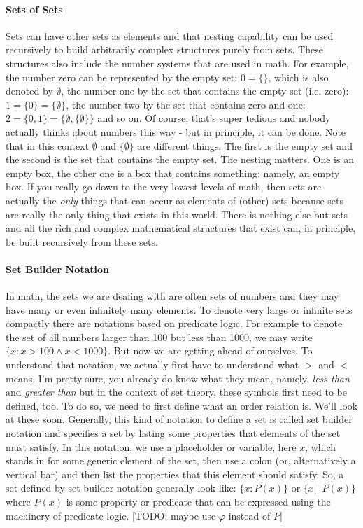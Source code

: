 \paragraph{Sets of Sets}
Sets can have other sets as elements and that nesting capability can be used recursively to build arbitrarily complex structures purely from sets. These structures also include the number systems that are used in math. For example, the number zero can be represented by the empty set: $0 = \{\}$, which is also denoted by $\emptyset$, the number one by the set that contains the empty set (i.e. zero): $1 = \{ 0 \} =  \{ \emptyset \}$, the number two by the set that contains zero and one: $2 = \{ 0, 1 \} = \{ \emptyset, \{ \emptyset \} \}$ and so on. Of course, that's super tedious and nobody actually thinks about numbers this way - but in principle, it can be done. Note that in this context $\emptyset$ and $\{ \emptyset \}$ are different things. The first is the empty set and the second is the set that contains the empty set. The nesting matters. One is an empty box, the other one is a box that contains something: namely, an empty box. If you really go down to the very lowest levels of math, then sets are actually the \emph{only} things that can occur as elements of (other) sets because sets are really the only thing that exists in this world. There is nothing else but sets and all the rich and complex mathematical structures that exist can, in principle, be built recursively from these sets. 

\paragraph{Set Builder Notation}
In math, the sets we are dealing with are often sets of numbers and they may have many or even infinitely many elements. To denote very large or infinite sets compactly there are notations based on predicate logic. For example to denote the set of all numbers larger than 100 but less than 1000, we may write $\{x : x > 100 \wedge x < 1000\}$. But now we are getting ahead of ourselves. To understand that notation, we actually first have to understand what $>$ and $<$ means. I'm pretty sure, you already do know what they mean, namely, \emph{less than} and \emph{greater than} but in the context of set theory, these symbols first need to be defined, too. To do so, we need to first define what an order relation is. We'll look at these soon. Generally, this kind of notation to define a set is called set builder notation and specifies a set by listing some properties that elements of the set must satisfy. In this notation, we use a placeholder or variable, here $x$, which stands in for some generic element of the set, then use a colon (or, alternatively a vertical bar) and then list the properties that this element should satisfy. So, a set defined by set builder notation generally look like: $\{x : P(x)\}$ or  $\{x \; | \; P(x)\}$ where $P(x)$ is some property or predicate that can be expressed using the machinery of predicate logic. [TODO: maybe use $\varphi$ instead of $P$]

